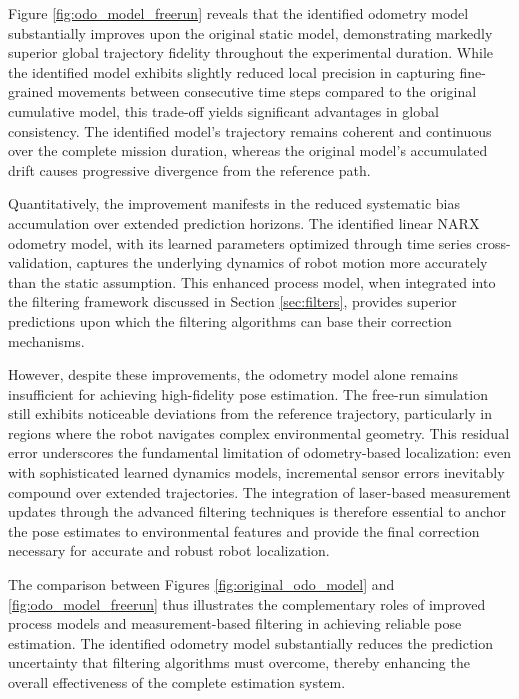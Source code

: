 \documentclass[conference]{IEEEtran}
\begin{document}
Figure \ref{fig:odo_model_freerun} reveals that the identified odometry model substantially improves upon the original static model, demonstrating markedly superior global trajectory fidelity throughout the experimental duration. While the identified model exhibits slightly reduced local precision in capturing fine-grained movements between consecutive time steps compared to the original cumulative model, this trade-off yields significant advantages in global consistency. The identified model's trajectory remains coherent and continuous over the complete mission duration, whereas the original model's accumulated drift causes progressive divergence from the reference path.

Quantitatively, the improvement manifests in the reduced systematic bias accumulation over extended prediction horizons. The identified linear NARX odometry model, with its learned parameters optimized through time series cross-validation, captures the underlying dynamics of robot motion more accurately than the static assumption. This enhanced process model, when integrated into the filtering framework discussed in Section \ref{sec:filters}, provides superior predictions upon which the filtering algorithms can base their correction mechanisms.

However, despite these improvements, the odometry model alone remains insufficient for achieving high-fidelity pose estimation. The free-run simulation still exhibits noticeable deviations from the reference trajectory, particularly in regions where the robot navigates complex environmental geometry. This residual error underscores the fundamental limitation of odometry-based localization: even with sophisticated learned dynamics models, incremental sensor errors inevitably compound over extended trajectories. The integration of laser-based measurement updates through the advanced filtering techniques is therefore essential to anchor the pose estimates to environmental features and provide the final correction necessary for accurate and robust robot localization.

The comparison between Figures \ref{fig:original_odo_model} and \ref{fig:odo_model_freerun} thus illustrates the complementary roles of improved process models and measurement-based filtering in achieving reliable pose estimation. The identified odometry model substantially reduces the prediction uncertainty that filtering algorithms must overcome, thereby enhancing the overall effectiveness of the complete estimation system.
\end{document}
